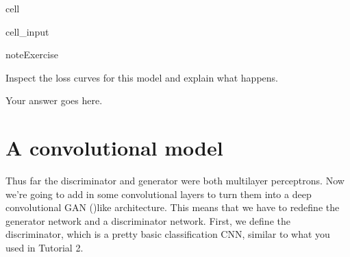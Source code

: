 \documentclass[letterpaper,10pt,english]{jupyterBook}
\begin{document}
\begin{sphinxuseclass}{cell}\begin{sphinxVerbatimInput}

\begin{sphinxuseclass}{cell_input}
\begin{sphinxVerbatim}[commandchars=\\\{\}]
 
  
  
\end{sphinxVerbatim}

\end{sphinxuseclass}\end{sphinxVerbatimInput}

\end{sphinxuseclass}
\begin{sphinxadmonition}{note}{Exercise}

\sphinxAtStartPar
Inspect the loss curves for this model and explain what happens.
\end{sphinxadmonition}

\sphinxAtStartPar
Your answer goes here.


\section{A convolutional model}
\label{\detokenize{notebooks/Tutorial4_Generative_Models/Tutorial4_Generative_Models_student:a-convolutional-model}}
\sphinxAtStartPar
Thus far the discriminator and generator were both multilayer perceptrons. Now we’re going to add in some convolutional layers to turn them into a deep convolutional GAN ()\sphinxhyphen{}like architecture. This means that we have to redefine the generator network and a discriminator network. First, we define the discriminator, which is a pretty basic classification CNN, similar to what you used in Tutorial 2.
\end{document}
